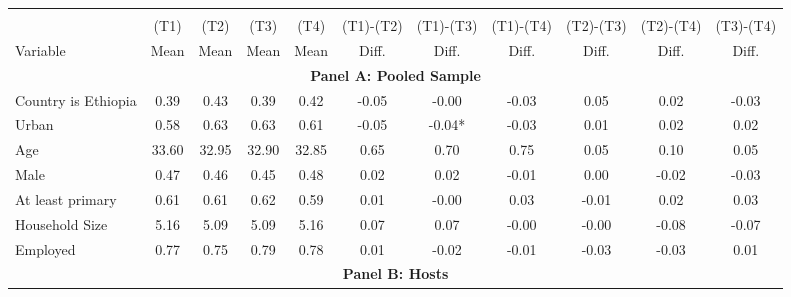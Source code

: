 

\begin{tabular}{@{\extracolsep{5pt}}lcccccccccc}
	\\[-1.8ex]\hline \hline \\[-1.8ex]
	& \multicolumn{1}{c}{(T1)}  & \multicolumn{1}{c}{(T2)}  & \multicolumn{1}{c}{(T3)}  & \multicolumn{1}{c}{(T4)}  & \multicolumn{1}{c}{(T1)-(T2)} & \multicolumn{1}{c}{(T1)-(T3)} & \multicolumn{1}{c}{(T1)-(T4)} & \multicolumn{1}{c}{(T2)-(T3)} & \multicolumn{1}{c}{(T2)-(T4)} & \multicolumn{1}{c}{(T3)-(T4)}  \\
	Variable & Mean & Mean & Mean & Mean & Diff. & Diff. & Diff. & Diff. & Diff. & Diff. \\ 
	\midrule \midrule  \multicolumn{11}{c}{\textbf{Panel A: Pooled Sample}} \\  \midrule 
Country is Ethiopia      & 0.39      & 0.43      & 0.39    & 0.42       & -0.05    & -0.00      & -0.03     & 0.05     & 0.02      & -0.03   \\
Urban      & 0.58       & 0.63       & 0.63        & 0.61       & -0.05    & -0.04*       & -0.03     & 0.01       & 0.02     & 0.02   \\
Age    & 33.60     & 32.95     & 32.90     & 32.85     & 0.65      & 0.70     & 0.75       & 0.05   & 0.10       & 0.05   \\
Male     & 0.47      & 0.46      & 0.45      & 0.48     & 0.02     & 0.02     & -0.01    & 0.00       & -0.02      & -0.03   \\
At least primary     & 0.61      & 0.61        & 0.62   & 0.59   & 0.01    & -0.00   & 0.03   & -0.01      & 0.02   & 0.03   \\
Household Size  & 5.16      & 5.09   & 5.09     & 5.16     & 0.07    & 0.07    & -0.00   & -0.00   & -0.08    & -0.07   \\
Employed   & 0.77     & 0.75   & 0.79    & 0.78    & 0.01   & -0.02   & -0.01    & -0.03   & -0.03     & 0.01   \\
	\midrule \midrule  \multicolumn{11}{c}{\textbf{Panel B: Hosts}} \\  \midrule 

\end{tabular}
